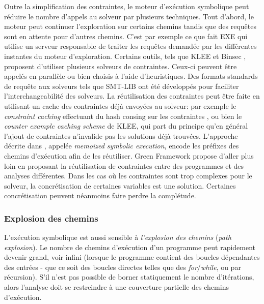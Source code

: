                 Outre la simplification des contraintes, le moteur d'exécution symbolique peut réduire le nombre d'appels au solveur par plusieurs techniques.
                Tout d'abord, le moteur peut continuer l'exploration sur certains chemins tandis que des requêtes sont en attente pour d'autres chemins. C'est par exemple ce que fait EXE qui utilise un serveur responsable de traiter les requêtes demandée par les différentes instantes du moteur d'exploration.
                Certains outils, tels que KLEE et Binsec \cite{Djoudi/CTACAS15, Binsecgithub}, proposent d'utiliser plusieurs solveurs de contraintes. Ceux-ci peuvent être appelés en parallèle ou bien choisis à l'aide d'heuristiques.  
                Des formats standards de requête aux solveurs tels que SMT-LIB \cite{BarFT-SMTLIB} ont été développés pour faciliter l'interchangeabilité des solveurs.
                La réutilisation des contraintes peut être faite en utilisant un cache des contraintes déjà envoyées au solveur: par exemple le \textit{constraint caching} effectuant du hash consing sur les contraintes \cite{Cadar/ACM13}, ou bien le \textit{counter example caching scheme} de KLEE, qui part du principe qu'en général l'ajout de contraintes n'invalide pas les solutions déjà trouvées.
                L'approche décrite dans \cite{yang2012memoized}, appelée \textit{memoized symbolic execution}, encode les préfixes des chemins d'exécution afin de les réutiliser. 
                Green Framework \cite{visser2012green, jia2015enhancing} propose d'aller plus loin en proposant la réutilisation de contraintes entre des programmes et des analyses différentes.
                Dans les cas où les contraintes sont trop complexes pour le solveur, la concrétisation de certaines variables est une solution. Certaines concrétisation peuvent néanmoins faire perdre la complétude.
                
            \subsubsection{Explosion des chemins}
                
                L'exécution symbolique est aussi sensible à \textit{l'explosion des chemins} (\textit{path explosion}). Le nombre de chemins d'exécution d'un programme peut rapidement devenir grand, voir infini (lorsque le programme contient des boucles dépendantes des entrées - que ce soit des boucles directes telles que des \textit{for}/\textit{while}, ou par récursion). S'il n'est pas possible de borner statiquement le nombre d'itérations, alors l'analyse doit se restreindre à une couverture partielle des chemins d'exécution. 
                
